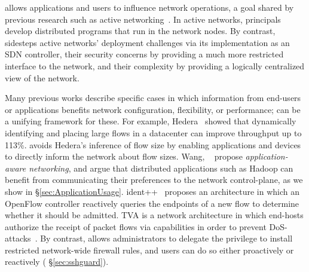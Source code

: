 %
\sys allows applications and users to influence
network operations, a goal shared by previous research such as
active networking~\cite{ActiveNetworking}. In active networks, principals
develop distributed programs that run in the network nodes. By contrast,
\sys sidesteps active networks' deployment challenges via its implementation
as an SDN controller, their security concerns by providing a much more restricted
interface to the network, and their complexity by providing a logically centralized
view of the network.

%
Many previous works describe specific cases in which information
from end-users or applications benefits network configuration,
flexibility, or performance; \sys can be a unifying framework for
these.  For example, Hedera~\cite{alfares10hedera} showed that
dynamically identifying and placing large flows in a datacenter can
improve throughput up to 113\%. \sys avoids Hedera's
inference of flow size by enabling applications and devices to
directly inform the network about flow sizes. 
Wang, \etal~\cite{Wang:2012} propose \emph{application-aware networking},
and argue
that distributed applications such as Hadoop can benefit from
communicating their preferences to the network control-plane, as we
show in \S\ref{sec:ApplicationUsage}.
%
ident++~\cite{naous09ident++}
proposes an architecture in which an OpenFlow controller reactively
queries the endpoints of a new flow to determine whether it should
be admitted. 
TVA is a network architecture in which end-hosts authorize the receipt
of packet flows via capabilities in order to prevent DoS-attacks~\cite{Yang:2005}.
By contrast, \sys allows administrators to delegate the
privilege to install restricted network-wide firewall rules, and
users can do so either proactively or reactively (\cf
\S\ref{sec:sshguard}).  


